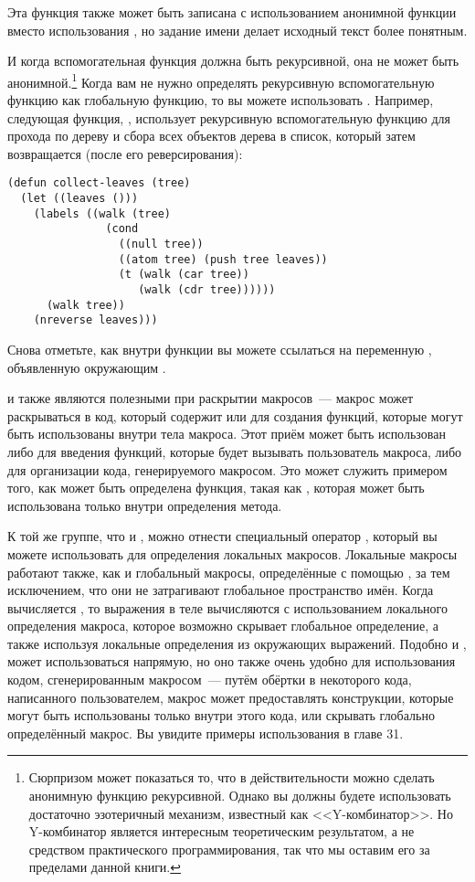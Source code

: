 Эта функция также может быть записана с использованием анонимной функции вместо
использования , но задание имени делает исходный текст более понятным.

И когда вспомогательная функция должна быть рекурсивной, она не может быть
анонимной.\footnote{Сюрпризом может показаться то, что в действительности можно сделать
  анонимную функцию рекурсивной.  Однако вы должны будете использовать достаточно
  эзотеричный механизм, известный как <<Y-комбинатор>>.  Но Y-комбинатор является интересным
  теоретическим результатом, а не средством практического программирования, так что мы
  оставим его за пределами данной книги.}  Когда вам не нужно определять рекурсивную
вспомогательную функцию как глобальную функцию, то вы можете использовать .
Например, следующая функция, , использует рекурсивную вспомогательную
функцию  для прохода по дереву и сбора всех объектов дерева в список, который
затем возвращается  (после его реверсирования):

\begin{lstlisting}
(defun collect-leaves (tree)
  (let ((leaves ()))
    (labels ((walk (tree)
               (cond
                 ((null tree))
                 ((atom tree) (push tree leaves))
                 (t (walk (car tree))
                    (walk (cdr tree))))))
      (walk tree))
    (nreverse leaves)))
\end{lstlisting}


Снова отметьте, как внутри функции  вы можете ссылаться на переменную
, объявленную окружающим .

 и  также являются полезными при раскрытии макросов~--- макрос
может раскрываться в код, который содержит  или  для создания
функций, которые могут быть использованы внутри тела макроса.  Этот приём может быть
использован либо для введения функций, которые будет вызывать пользователь макроса, либо
для организации кода, генерируемого макросом.  Это может служить примером того, как может
быть определена функция, такая как , которая может быть
использована только внутри определения метода.

К той же группе, что  и , можно отнести специальный оператор
, который вы можете использовать для определения локальных
макросов. Локальные макросы работают также, как и глобальный макросы, определённые с
помощью , за тем исключением, что они не затрагивают глобальное
пространство имён.  Когда вычисляется , то выражения в теле вычисляются с
использованием локального определения макроса, которое возможно скрывает глобальное
определение, а также используя локальные определения из окружающих выражений.  Подобно
 и ,  может использоваться напрямую, но оно также
очень удобно для использования кодом, сгенерированным макросом~--- путём обёртки в
 некоторого кода, написанного пользователем, макрос может предоставлять
конструкции, которые могут быть использованы только внутри этого кода, или скрывать
глобально определённый макрос.  Вы увидите примеры использования  в главе
31.

